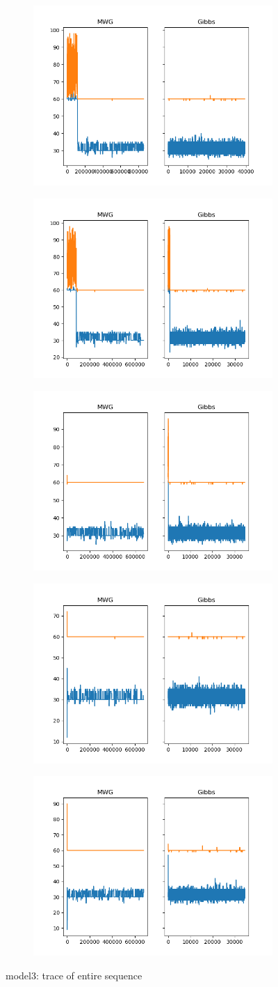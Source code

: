 \begin{figure}[h]
    \centering
    \begin{subfigure}
    	\centering
        \includegraphics[width=0.3\linewidth]{../../plots/Trace_M3_N100_NMCMC3_seed0_diffind2.png}
    \end{subfigure}
    \begin{subfigure}
        \centering
    	\includegraphics[width=0.3\linewidth]{../../plots/Trace_M3_N100_NMCMC3_seed1_diffind2.png}
	\end{subfigure}
	\begin{subfigure}
	    \centering
    	\includegraphics[width=0.3\linewidth]{../../plots/Trace_M3_N100_NMCMC3_seed2_diffind2.png}
	\end{subfigure}
	\begin{subfigure}
	    \centering
    	\includegraphics[width=0.3\linewidth]{../../plots/Trace_M3_N100_NMCMC3_seed3_diffind2.png}
	\end{subfigure}
	\begin{subfigure}
	    \centering
    	\includegraphics[width=0.3\linewidth]{../../plots/Trace_M3_N100_NMCMC3_seed4_diffind2.png}
	\end{subfigure}
	\caption{model3: trace of entire sequence}
\end{figure}

